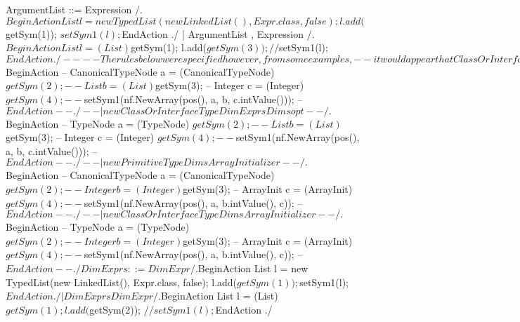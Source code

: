    ArgumentList ::= Expression
        /.$BeginAction
                    List l = new TypedList(new LinkedList(), Expr.class, false);
                    l.add($getSym(1));
                    $setSym1(l);
          $EndAction
        ./
                   | ArgumentList , Expression
        /.$BeginAction
                    List l = (List) $getSym(1);
                    l.add($getSym(3));
                    //$setSym1(l);
          $EndAction
        ./

--
-- The rules below were specified however, from some examples,
-- it would appear that ClassOrInterfaceType is expected instead
-- of TypeName
--
--                              | new TypeName DimExprs Dimsopt
--                              | new TypeName Dims ArrayInitializer
--
--    ArrayCreationExpression ::= new PrimitiveType DimExprs Dimsopt
--        /.$BeginAction
--                    CanonicalTypeNode a = (CanonicalTypeNode) $getSym(2);
--                    List b = (List) $getSym(3);
--                    Integer c = (Integer) $getSym(4);
--                    $setSym1(nf.NewArray(pos(), a, b, c.intValue()));
--          $EndAction
--        ./
--                              | new ClassOrInterfaceType DimExprs Dimsopt
--        /.$BeginAction
--                    TypeNode a = (TypeNode) $getSym(2);
--                    List b = (List) $getSym(3);
--                    Integer c = (Integer) $getSym(4);
--                    $setSym1(nf.NewArray(pos(), a, b, c.intValue()));
--          $EndAction
--        ./
--                              | new PrimitiveType Dims ArrayInitializer
--        /.$BeginAction
--                    CanonicalTypeNode a = (CanonicalTypeNode) $getSym(2);
--                    Integer b = (Integer) $getSym(3);
--                    ArrayInit c = (ArrayInit) $getSym(4);
--                    $setSym1(nf.NewArray(pos(), a, b.intValue(), c));
--          $EndAction
--        ./
--                              | new ClassOrInterfaceType Dims ArrayInitializer
--        /.$BeginAction
--                    TypeNode a = (TypeNode) $getSym(2);
--                    Integer b = (Integer) $getSym(3);
--                    ArrayInit c = (ArrayInit) $getSym(4);
--                    $setSym1(nf.NewArray(pos(), a, b.intValue(), c));
--          $EndAction
--        ./
    
    DimExprs ::= DimExpr
        /.$BeginAction
                    List l = new TypedList(new LinkedList(), Expr.class, false);
                    l.add($getSym(1));
                    $setSym1(l);
          $EndAction
        ./
               | DimExprs DimExpr
        /.$BeginAction
                    List l = (List) $getSym(1);
                    l.add($getSym(2));
                    //$setSym1(l);
          $EndAction
        ./
    
